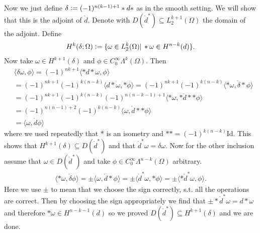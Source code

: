 \documentclass[12pt,a4paper]{article}
\theoremstyle{definition}
\newcommand{\smoothcompforms}[2]{C_0^\infty \Lambda^{#1}(#2)}
\begin{document}
Now we just define $\delta \vcentcolon= (-1)^{n(k-1)+1}*d*$ as in the smooth
setting. We will show that this is the adjoint of $\mathring{d}$. Denote with
$D(\mathring{d}^*) \subseteq L_2^{k+1}(\Omega)$ the domain of the adjoint. 
Define 
\begin{align*}
    H^k(\delta; \Omega) \vcentcolon= \{ \omega \in L^k_2(\Omega) | \,
    *\omega \in H^{n-k}(d) \}.
\end{align*}
Now take $\omega \in H^{k+1}(\delta)$ and $\phi \in 
\smoothcompforms{k}{\Omega}$. Then 
\begin{align*}
    &\langle \delta \omega, \phi \rangle = 
    (-1)^{nk+1} \langle *d* \omega, \phi \rangle \\  
    &= (-1)^{nk+1} (-1)^{k(n-k)} \langle d* \omega, *\phi \rangle =
    (-1)^{nk+1} (-1)^{k(n-k)} 
        \langle * \omega, \mathring{\delta}*\phi \rangle \\
    &= (-1)^{nk+1} (-1)^{k(n-k)} (-1)^{n(n-k-1)+1}
        \langle * \omega, *\mathring{d}**\phi \rangle \\
    &=(-1)^{n(n-1)+2} (-1)^{k(n-k)} \langle \omega, \mathring{d}**\phi \rangle\\
    &= \langle \omega, \mathring{d}\phi \rangle
\end{align*}
where we used repeatedly that $*$ is an isometry and 
$** = (-1)^{k(n-k)}\text{Id}$. This shows that $H^{k+1}(\delta) \subseteq 
D(\mathring{d}^*)$ and that $\mathring{d}^* \omega = \delta \omega$. Now for 
the other inclusion assume that $\omega \in D(\mathring{d}^*)$ and take 
$\phi \in \smoothcompforms{n-k}{\Omega}$ arbitrary.
\begin{align*}
    \langle *\omega, \mathring{\delta}\phi \rangle = \pm 
    \langle \omega, \mathring{d}*\phi \rangle = 
    \pm \langle \mathring{d}^* \omega, *\phi \rangle = 
    \pm \langle *\mathring{d}^* \omega, \phi \rangle.
\end{align*} 
Here we use $\pm$ to mean that we choose the sign correctly, s.t. all the
operations are correct. Then by choosing the sign appropriately we find that
$ \pm *\mathring{d}^* \omega = d*\omega$ and therefore 
$*\omega \in H^{n-k-1}(d)$ so we proved $D(\mathring{d}^*) \subseteq 
H^{k+1}(\delta)$ and we are done.
\end{document}
